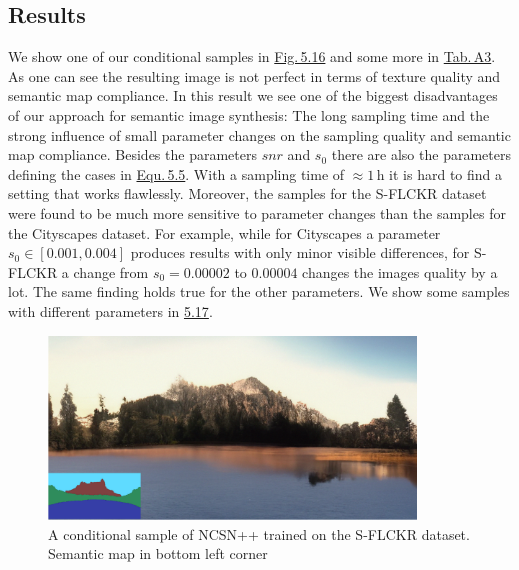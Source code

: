 \subsection{Results}
We show one of our conditional samples in \hyperref[fig:5.16]{Fig.\,5.16} and some more in \hyperref[tab:a3]{Tab.\,A3}. As one can see the resulting image is not perfect in terms of texture quality and semantic map compliance. In this result we see one of the biggest disadvantages of our approach for semantic image synthesis: The long sampling time and the strong influence of small parameter changes on the sampling quality and semantic map compliance. Besides the parameters $snr$ and $s_0$ there are also the parameters defining the cases in \hyperref[equ:5.5]{Equ.\,5.5}. With a sampling time of $\approx1$\,h it is hard to find a setting that works flawlessly. Moreover, the samples for the S-FLCKR dataset were found to be much more sensitive to parameter changes than the samples for the Cityscapes dataset. For example, while for Cityscapes a parameter $s_0\in[0.001,0.004]$ produces results with only minor visible differences, for S-FLCKR a change from $s_0=0.00002$ to $0.00004$ changes the images quality by a lot. The same finding holds true for the other parameters. We show some samples with different parameters in \hyperref[5.17]{5.17}. 
%
\begin{figure} \label{fig:5.16}
    \centering
    \includegraphics[width=0.87\textwidth]{Chapters/figures/experiments/flickr/flickr_sample_1.PNG}
    \caption[A conditional sample of NCSN++ trained on the S-FLCKR dataset]{A conditional sample of NCSN++ trained on the S-FLCKR dataset. Semantic map in bottom left corner}
\end{figure}
%

